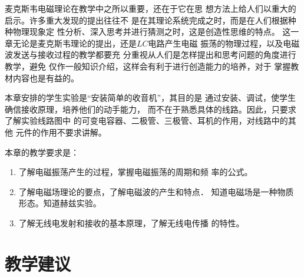 麦克斯韦电磁理论在教学中之所以重要，还在于它在思
想方法上给人们以重大的启示。许多重大发现的提出往往不
是在其理论系统完成之时，而是在人们根据种种物理现象定
性分析、深入思考并进行猜测之时，这是创造性思维的特点。
这一章无论是麦克斯韦理论的提出，还是$LC$电路产生电磁
振荡的物理过程，以及电磁波发送与接收过程的教学都要充
分重视从人们是怎样提出和思考问题的角度进行教学，避免
仅作一般知识介绍，这样会有利于进行创造能力的培养，对于
掌握教材内容也是有益的。

本章安排的学生实验是“安装简单的收音机”，其目的是
通过安装、调试，使学生确信接收原理，培养他们的动手能力，
而不在于熟悉具体的线路。因此，只要求了解实验线路图中
的可变电容器、二极管、三极管、耳机的作用，对线路中的其他
元件的作用不要求讲解。

本章的教学要求是：
\begin{enumerate}
\item 了解电磁振荡产生的过程，掌握电磁振荡的周期和频
率的公式。
\item 了解电磁场理论的要点，了解电磁波的产生和特点．
知道电磁场是一种物质形态。知道赫兹实验。
\item 了解无线电发射和接收的基本原理，了解无线电传播
的特性。
\end{enumerate}

\section{教学建议}
